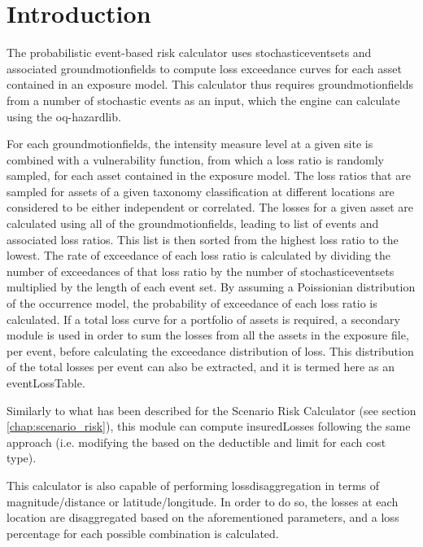 \section{Introduction}
The probabilistic event-based risk calculator uses \glspl{stochasticeventset} and associated \glspl{groundmotionfield} to compute loss exceedance curves for each \gls{asset} contained in an \gls{exposure model}. This calculator thus requires \glspl{groundmotionfield} from a number of stochastic events as an input, which the engine can calculate using the oq-hazardlib.

For each \glspl{groundmotionfield}, the intensity measure level at a given site is combined with a \gls{vulnerability function}, from which a loss ratio is randomly sampled, for each \gls{asset} contained in the \gls{exposure model}. The loss ratios that are sampled for \glspl{asset} of a given \gls{taxonomy} classification at different locations are considered to be either independent or correlated. The losses for a given asset are calculated using all of the \glspl{groundmotionfield}, leading to list of events and associated loss ratios. This list is then sorted from the highest loss ratio to the lowest. The rate of exceedance of each loss ratio is calculated by dividing the number of exceedances of that loss ratio by the number of \glspl{stochasticeventset} multiplied by the length of each event set. By assuming a Poissionian distribution of the occurrence model, the probability of exceedance of each loss ratio is calculated. If a total loss curve for a portfolio of \glspl{asset} is required, a secondary module is used in order to sum the losses from all the \glspl{asset} in the exposure file, per event, before calculating the exceedance distribution of loss. This distribution of the total losses per event can also be extracted, and it is termed here as an \gls{eventLossTable}.

Similarly to what has been described for the Scenario Risk Calculator (see section \ref{chap:scenario_risk}), this module can compute \gls{insuredLosses} following the same approach (i.e. modifying the  based on the \gls{deductible} and \gls{limit} for each cost type).

This calculator is also capable of performing \gls{lossdisaggregation} in terms of magnitude/distance or latitude/longitude. In order to do so, the losses at each location are disaggregated based on the aforementioned parameters, and a loss percentage for each possible combination is calculated.


